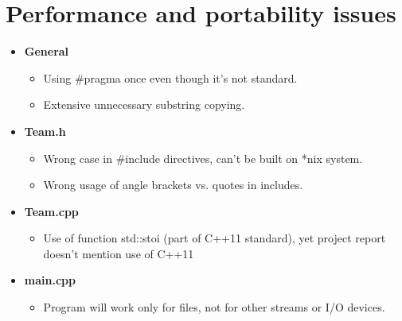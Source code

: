 \documentclass[10pt,a4paper]{article}
\begin{document}
\section*{Performance and portability issues}
\begin{itemize}
	\item \textbf{General}
	\begin{itemize}
		\item Using \#pragma once even though it's not standard.
		\item Extensive unnecessary substring copying.
	\end{itemize}
	\item \textbf{Team.h}
	\begin{itemize}
		\item Wrong case in \#include directives, can't be built on *nix system.
		\item Wrong usage of angle brackets vs. quotes in includes.
	\end{itemize}
	\item \textbf{Team.cpp}
	\begin{itemize}
		\item Use of function std::stoi (part of C++11 standard), yet project report doesn't mention use of C++11
	\end{itemize}
	\item \textbf{main.cpp}
	\begin{itemize}
		\item Program will work only for files, not for other streams or I/O devices.
	\end{itemize}
\end{itemize}
\end{document}
